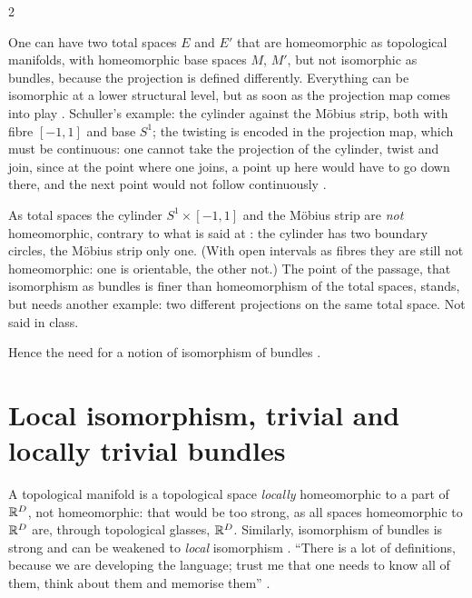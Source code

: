 \begin{paracol}{2}
\begin{intuition}\label{int:mf-iso-lower}
One can have two total spaces $E$ and $E'$ that are homeomorphic as topological manifolds, with homeomorphic base spaces $M$, $M'$, but not isomorphic as bundles, because the projection is defined differently. Everything can be isomorphic at a lower structural level, but as soon as the projection map comes into play
. Schuller's example: the cylinder against the Möbius strip, both with fibre $[-1,1]$ and base $S^1$; the twisting is encoded in the projection map, which must be continuous: one cannot take the projection of the cylinder, twist and join, since at the point
where one joins, a point up here would have to go down there, and the next point would not follow continuously .
\end{intuition}
\begin{coursenote}
As total spaces the cylinder $S^1\times[-1,1]$ and the Möbius strip are \emph{not} homeomorphic, contrary to what is said at : the cylinder has two boundary circles, the Möbius strip only one. (With open intervals as fibres they are
still not homeomorphic: one is orientable, the other not.) The point of the passage, that isomorphism as bundles is finer than homeomorphism of the total spaces, stands, but needs another example: two different projections on the same total space. Not said in class.
\end{coursenote}
Hence the need for a notion of isomorphism of bundles .

\section{Local isomorphism, trivial and locally trivial bundles}\label{sec:mf-local}

A topological manifold is a topological space \emph{locally} homeomorphic to a part of $\mathbb{R}^D$, not homeomorphic: that would be too strong, as all spaces homeomorphic to $\mathbb{R}^D$ are, through topological glasses, $\mathbb{R}^D$. Similarly, isomorphism of bundles is strong and can be weakened to
\emph{local} isomorphism . ``There is a lot of definitions, because we are developing the language; trust me that one needs to know all of them, think about them and memorise them'' .


\end{paracol}
